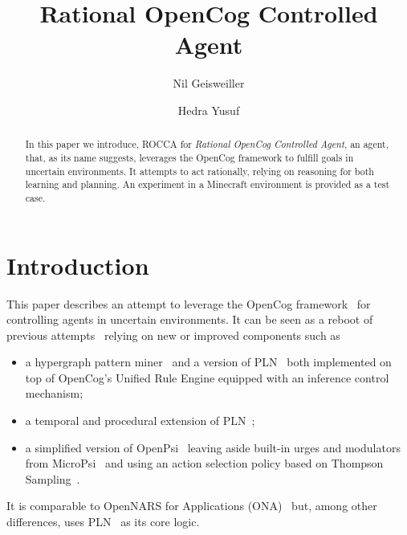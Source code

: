 \documentclass[runningheads]{llncs}
\begin{document}
%
\title{Rational OpenCog Controlled Agent}

%
\author{Nil Geisweiller
  \and Hedra Yusuf}
%
%
%
\maketitle              %
%

\begin{abstract}
  In this paper we introduce, ROCCA for \emph{Rational OpenCog
    Controlled Agent}, an agent, that, as its name suggests, leverages
  the OpenCog framework to fulfill goals in uncertain environments.
  It attempts to act rationally, relying on reasoning for both
  learning and planning.  An experiment in a Minecraft environment is
  provided as a test case.

\end{abstract}

\section{Introduction}
This paper describes an attempt to leverage the OpenCog
framework~\cite{Hart2008} for controlling agents in uncertain
environments.  It can be seen as a reboot of previous
attempts~\cite{Goertzel2008, Goertzel2011CSP, Cai2013}
relying on new or improved components such as
\begin{itemize}
\item a hypergraph pattern miner~\cite{Geisweiller2019} and a version
  of PLN~\cite{Goertzel2009} both implemented on top of OpenCog's
  Unified Rule Engine equipped with an inference control mechanism;
\item a temporal and procedural extension of
  PLN~\cite{Geisweiller2023TPLN};
\item a simplified version of OpenPsi~\cite{Cai2013} leaving
  aside built-in urges and modulators from MicroPsi~\cite{Bach2012}
  and using an action selection policy based on Thompson
  Sampling~\cite{Leike2016}.
\end{itemize}
It is comparable to OpenNARS for Applications (ONA)~\cite{Hammer2020}
but, among other differences, uses PLN~\cite{Goertzel2009} as its core
logic.
\end{document}
